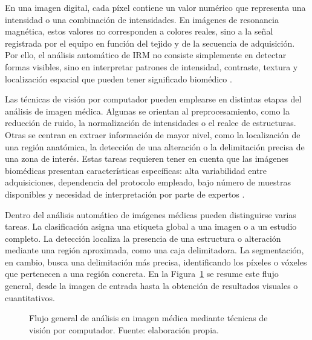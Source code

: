 En una imagen digital, cada píxel contiene un valor numérico que representa una intensidad o una combinación de intensidades. En imágenes de resonancia magnética, estos valores no corresponden a colores reales, sino a la señal registrada por el equipo en función del tejido y de la secuencia de adquisición. Por ello, el análisis automático de IRM no consiste simplemente en detectar formas visibles, sino en interpretar patrones de intensidad, contraste, textura y localización espacial que pueden tener significado biomédico \citep{litjens2017survey,yamashita2018cnnRadiology}.

Las técnicas de visión por computador pueden emplearse en distintas etapas del análisis de imagen médica. Algunas se orientan al preprocesamiento, como la reducción de ruido, la normalización de intensidades o el realce de estructuras. Otras se centran en extraer información de mayor nivel, como la localización de una región anatómica, la detección de una alteración o la delimitación precisa de una zona de interés. Estas tareas requieren tener en cuenta que las imágenes biomédicas presentan características específicas: alta variabilidad entre adquisiciones, dependencia del protocolo empleado, bajo número de muestras disponibles y necesidad de interpretación por parte de expertos \citep{litjens2017survey,hesamian2019deep}.

Dentro del análisis automático de imágenes médicas pueden distinguirse varias tareas. La clasificación asigna una etiqueta global a una imagen o a un estudio completo. La detección localiza la presencia de una estructura o alteración mediante una región aproximada, como una caja delimitadora. La segmentación, en cambio, busca una delimitación más precisa, identificando los píxeles o vóxeles que pertenecen a una región concreta. En la Figura~\ref{fig:flujo_general_imagen_medica} se resume este flujo general, desde la imagen de entrada hasta la obtención de resultados visuales o cuantitativos.

\begin{figure}[htbp]
    \centering
    \caption{Flujo general de análisis en imagen médica mediante técnicas de visión por computador. Fuente: elaboración propia.}
    \label{fig:flujo_general_imagen_medica}
\end{figure}

